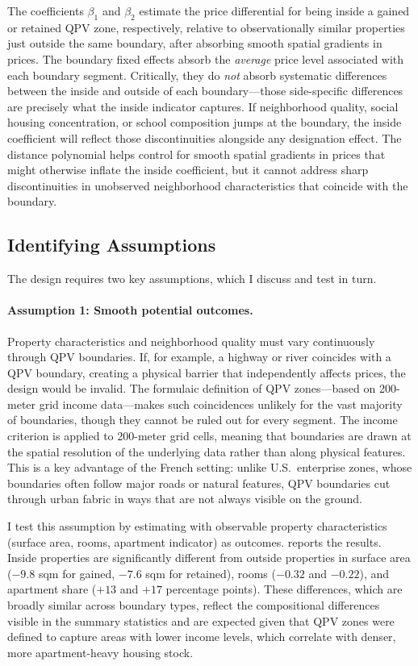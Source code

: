 \documentclass[12pt]{article}
\begin{document}
The coefficients $\beta_1$ and $\beta_2$ estimate the price differential for being inside a gained or retained QPV zone, respectively, relative to observationally similar properties just outside the same boundary, after absorbing smooth spatial gradients in prices. The boundary fixed effects absorb the \textit{average} price level associated with each boundary segment. Critically, they do \textit{not} absorb systematic differences between the inside and outside of each boundary---those side-specific differences are precisely what the inside indicator captures. If neighborhood quality, social housing concentration, or school composition jumps at the boundary, the inside coefficient will reflect those discontinuities alongside any designation effect. The distance polynomial helps control for smooth spatial gradients in prices that might otherwise inflate the inside coefficient, but it cannot address sharp discontinuities in unobserved neighborhood characteristics that coincide with the boundary.

\subsection{Identifying Assumptions}

The design requires two key assumptions, which I discuss and test in turn.

\paragraph{Assumption 1: Smooth potential outcomes.} Property characteristics and neighborhood quality must vary continuously through QPV boundaries. If, for example, a highway or river coincides with a QPV boundary, creating a physical barrier that independently affects prices, the design would be invalid. The formulaic definition of QPV zones---based on 200-meter grid income data---makes such coincidences unlikely for the vast majority of boundaries, though they cannot be ruled out for every segment. The income criterion is applied to 200-meter grid cells, meaning that boundaries are drawn at the spatial resolution of the underlying data rather than along physical features. This is a key advantage of the French setting: unlike U.S.\ enterprise zones, whose boundaries often follow major roads or natural features, QPV boundaries cut through urban fabric in ways that are not always visible on the ground.

I test this assumption by estimating  with observable property characteristics (surface area, rooms, apartment indicator) as outcomes.  reports the results. Inside properties are significantly different from outside properties in surface area ($-9.8$ sqm for gained, $-7.6$ sqm for retained), rooms ($-0.32$ and $-0.22$), and apartment share ($+13$ and $+17$ percentage points). These differences, which are broadly similar across boundary types, reflect the compositional differences visible in the summary statistics and are expected given that QPV zones were defined to capture areas with lower income levels, which correlate with denser, more apartment-heavy housing stock.
\end{document}
